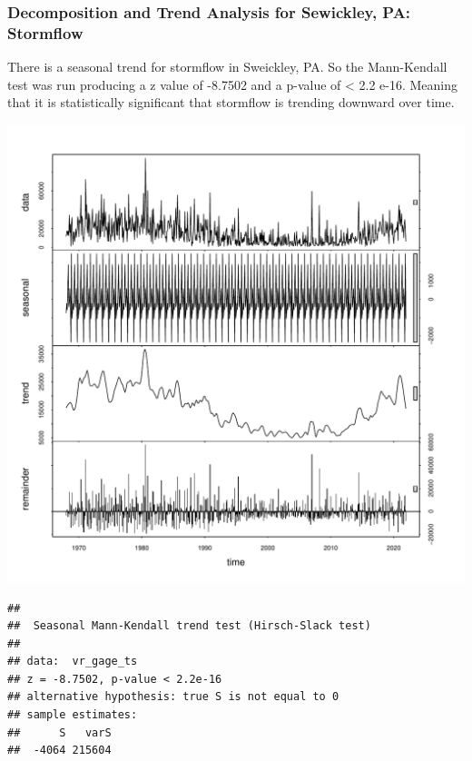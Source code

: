 \documentclass[
  12pt,
]{article}
\begin{document}
\newpage

\hypertarget{decomposition-and-trend-analysis-for-sewickley-pa-stormflow}{%
\subsubsection{Decomposition and Trend Analysis for Sewickley, PA:
Stormflow}\label{decomposition-and-trend-analysis-for-sewickley-pa-stormflow}}

There is a seasonal trend for stormflow in Sweickley, PA. So the
Mann-Kendall test was run producing a z value of -8.7502 and a p-value
of \textless{} 2.2 e-16. Meaning that it is statistically significant
that stormflow is trending downward over time.

\includegraphics{Draft_Final_files/figure-latex/seasonality_3-1.pdf}

\begin{verbatim}
## 
##  Seasonal Mann-Kendall trend test (Hirsch-Slack test)
## 
## data:  vr_gage_ts
## z = -8.7502, p-value < 2.2e-16
## alternative hypothesis: true S is not equal to 0
## sample estimates:
##      S   varS 
##  -4064 215604
\end{verbatim}
\end{document}
